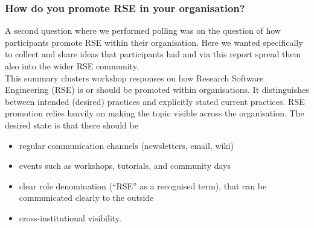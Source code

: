 \documentclass{eceasst}
\begin{document}
\subsubsection{How do you promote RSE in your organisation?}
A second question where we performed polling was on the question of how participants promote RSE within their organisation.
Here we wanted specifically to collect and share ideas that participants had and via this report spread them also into the wider RSE community.\\
This summary clusters workshop responses on how Research Software Engineering (RSE) is or should be promoted within organisations. It distinguishes between intended (desired) practices and explicitly stated current practices.
RSE promotion relies heavily on making the topic visible across the organisation. The desired state is that there should be

\begin{itemize}
\item regular communication channels (newsletters, email, wiki)
\item events such as workshops, tutorials, and community days
\item clear role denomination (“RSE” as a recognised term), that can be communicated clearly to the outside
\item cross-institutional visibility.
\end{itemize}
\end{document}
